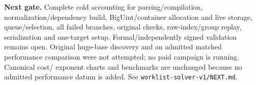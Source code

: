 \documentclass[10pt]{article}
\begin{document}
\textbf{Next gate.} Complete cold accounting for parsing/compilation,
normalization/dependency build, BigUint/container allocation and live storage,
queue/selection, all failed branches, original checks, raw-index/group replay,
serialization and one-target setup. Formal/independently signed validation
remains open. Original huge-base discovery and an admitted matched performance
comparison were not attempted; no paid campaign is running. Canonical cost/
exponent charts and benchmarks are unchanged because no admitted performance
datum is added. See \texttt{worklist-solver-v1/NEXT.md}.
\end{document}
